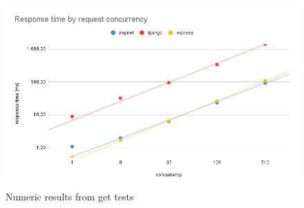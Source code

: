 \begin{figure}[H]
    \includegraphics[width=\columnwidth]{figures/pictures/resultsGet.png}
    \caption{Numeric results from get tests}
    \label{fig:resultsGet}
\end{figure}
